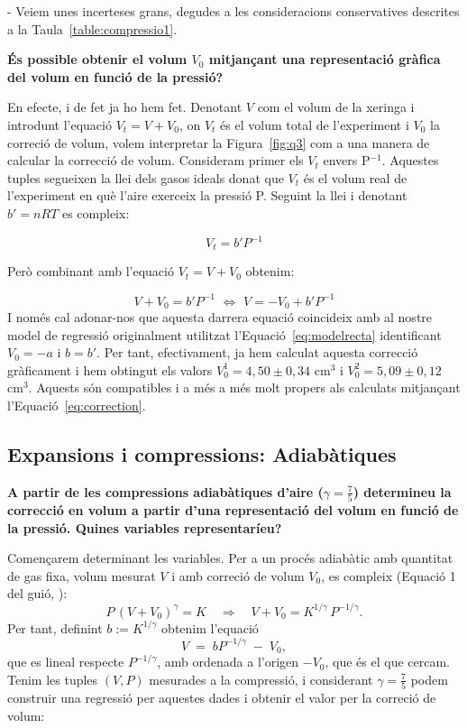 \documentclass[a4paper,twoside,12pt]{article}
\theoremstyle{definition}
\begin{document}
	
	- Veiem unes incerteses grans, degudes a les consideracions conservatives descrites a la Taula~\ref{table:compressio1}.
	
	
	\textbf{És possible obtenir el volum $V_0$ mitjançant una representació gràfica del volum en funció
		de la pressió?}
		
	En efecte, i de fet ja ho hem fet. Denotant $V$ com el volum de la xeringa i introdunt l'equació $V_t = V + V_0$, on $V_t$ és el volum total de l'experiment i $V_0$ la correció de volum, volem interpretar la Figura~\ref{fig:q3} com a una manera de calcular la correcció de volum. Consideram primer els $V_t$ envers P$^{-1}$. Aquestes tuples segueixen la llei dels gasos ideals donat que $V_t$ és el volum real de l'experiment en què l'aire exerceix la pressió P. Seguint la llei i denotant $b' = n RT$ es compleix:
	
	\begin{equation}
		\label{eq:corrv}
		 V_t = b' P^{-1}
	\end{equation}
	
	Però combinant amb l'equació $ V_t = V + V_0 $ obtenim:
	
	$$
	V + V_0 = b' P^{-1} \,\, \iff \,\, V = -V_0 +b'P^{-1}
	$$
	I només cal adonar-nos que aquesta darrera equació coincideix amb al nostre model de regressió originalment utilitzat l'Equació~\ref{eq:modelrecta} identificant $V_0 = -a$ i $b=b'$. Per tant, efectivament, ja hem calculat aquesta correcció gràficament i hem obtingut els valors $V^{1}_0 = 4,50 \pm 0,34$ cm$^3$ i $V^2_0 = 5,09 \pm 0,12$ cm$^3$. Aquests són compatibles i a més a més molt propers als calculats mitjançant l'Equació~\ref{eq:correction}.
	
		\newpage
	\subsection{Expansions i compressions: Adiabàtiques}
	

	\textbf{A partir de les compressions adiabàtiques d’aire ($\gamma=\tfrac{7}{5}$) determineu la correcció en volum a partir d’una representació del volum en funció de la pressió. Quines variables representaríeu?}
	
	Començarem determinant les variables. Per a un procés adiabàtic amb quantitat de gas fixa, volum mesurat $V$ i amb correció de volum $V_0$, es compleix (Equació 1 del guió, \cite{guio_practiques}):
	\[
	P\,(V+V_0)^{\gamma} = K \quad\Rightarrow\quad
	V+V_0 = K^{1/\gamma}\,P^{-1/\gamma}.
	\]
	Per tant, definint $b:=K^{1/\gamma}$ obtenim l'equació 
	\[
	V \;=\; b P^{-1/\gamma} \;-\; V_0,
	\]
	que es lineal respecte $P^{-1/\gamma}$, amb ordenada a l'origen $-V_0$, que és el que cercam. Tenim les tuples $(V,P)$ mesurades a la compressió, i considerant $\gamma=\tfrac{7}{5}$ podem construir una regressió per aquestes dades i obtenir el valor per la correció de volum:
	
\end{document}
